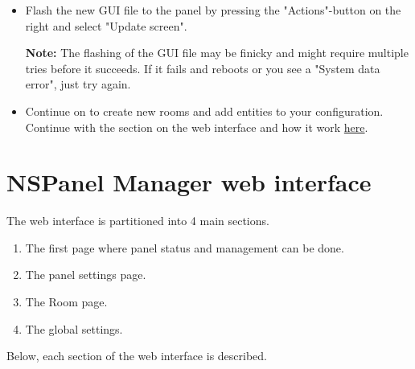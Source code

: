 \documentclass[10pt]{article}
\newcommand{\info}[1]{\begin{infoBox} \textbf{Info:} #1 \end{infoBox}}
\newcommand{\note}[1]{\begin{noteBox} \textbf{Note:} #1 \end{noteBox}}
\begin{document}
\begin{itemize}
      \info{If this is a US NSPanel version then it has to be set in the panel settings. Press the name of the NSPanel in the list and check the "Is US panel"-checkbox.}
      \item Flash the new GUI file to the panel by pressing the "Actions"-button on the right and select "Update screen".
      \note{The flashing of the GUI file may be finicky and might require multiple tries before it succeeds. If it fails and reboots or you see a "System data error", just try again.}
    \item Continue on to create new rooms and add entities to your configuration. Continue with the section on the web interface and how it work \hyperref[sec:nspanelmanager_web_interface]{here}.
    \end{itemize}

    \clearpage
    \section{NSPanel Manager web interface}
    \label{sec:nspanelmanager_web_interface}
    The web interface is partitioned into 4 main sections.
    \begin{enumerate}
      \item The first page where panel status and management can be done.
      \item The panel settings page.
      \item The Room page.
      \item The global settings.
    \end{enumerate}
    Below, each section of the web interface is described.
\end{document}
